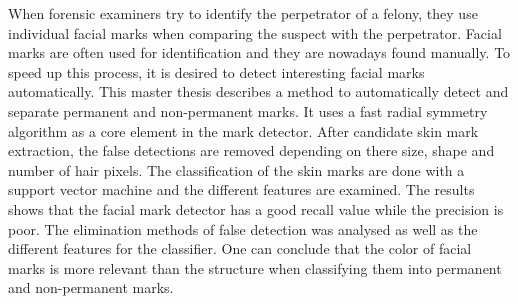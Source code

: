 When forensic examiners try to identify the perpetrator of a felony, they use individual facial marks when comparing the suspect with the perpetrator. Facial marks are often used for identification and they are nowadays found manually. To speed up this process, it is desired to detect interesting facial marks automatically. This master thesis describes a method to automatically detect and separate permanent and non-permanent marks. It uses a fast radial symmetry algorithm as a core element in the mark detector. After candidate skin mark extraction, the false detections are removed depending on there size, shape and number of hair pixels. The classification of the skin marks are done with a support vector machine and the different features are examined. The results shows that the facial mark detector has a good recall value while the precision is poor. The elimination methods of false detection was analysed as well as the different features for the classifier. One can conclude that the color of facial marks is more relevant than the structure when classifying them into permanent and non-permanent marks.
